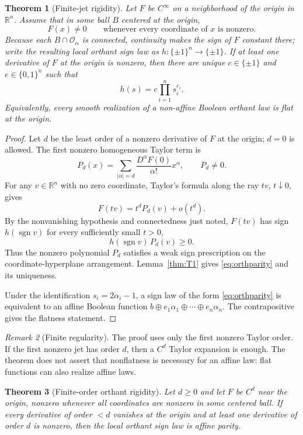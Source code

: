 \documentclass[11pt]{article}
\newtheorem{theorem}{Theorem}[section]
\theoremstyle{definition}
\theoremstyle{remark}
\newtheorem{remark}[theorem]{Remark}
\newcommand{\R}{\mathbb{R}}
\newcommand{\bits}{\{0,1\}}
\newcommand{\sign}{\operatorname{sgn}}
\begin{document}
\begin{theorem}[Finite-jet rigidity]\label{thm:T2}
Let $F$ be $C^\infty$ on a neighborhood of the origin in $\R^n$. Assume that in some ball $B$ centered at the origin,
\[
 F(x)\ne0
 \qquad\text{whenever every coordinate of $x$ is nonzero.}
\]
Because each $B\cap\mathcal O_\alpha$ is connected, continuity makes the sign of $F$ constant there; write the resulting local orthant sign law as $h:\{\pm1\}^n\to\{\pm1\}$. If at least one derivative of $F$ at the origin is nonzero, then there are unique $c\in\{\pm1\}$ and $e\in\bits^n$ such that
\begin{equation}\label{eq:orthparity}
 h(s)=c\prod_{i=1}^n s_i^{e_i}.
\end{equation}
Equivalently, every smooth realization of a non-affine Boolean orthant law is flat at the origin.
\end{theorem}

\begin{proof}
Let $d$ be the least order of a nonzero derivative of $F$ at the origin; $d=0$ is allowed. The first nonzero homogeneous Taylor term is
\[
 P_d(x)=\sum_{|\alpha|=d}\frac{D^\alpha F(0)}{\alpha!}x^\alpha,
 \qquad P_d\ne0.
\]
For any $v\in\R^n$ with no zero coordinate, Taylor's formula along the ray $tv$, $t\downarrow0$, gives
\[
 F(tv)=t^dP_d(v)+o(t^d).
\]
By the nonvanishing hypothesis and connectedness just noted, $F(tv)$ has sign $h(\sign v)$ for every sufficiently small $t>0$,
\[
 h(\sign v)\,P_d(v)\ge0.
\]
Thus the nonzero polynomial $P_d$ satisfies a weak sign prescription on the coordinate-hyperplane arrangement. Lemma~\ref{thm:T1} gives \eqref{eq:orthparity} and its uniqueness.

Under the identification $s_i=2\alpha_i-1$, a sign law of the form \eqref{eq:orthparity} is equivalent to an affine Boolean function $b\oplus e_1\alpha_1\oplus\cdots\oplus e_n\alpha_n$. The contrapositive gives the flatness statement.
\end{proof}

\begin{remark}[Finite regularity]
The proof uses only the first nonzero Taylor order. If the first nonzero jet has order $d$, then a $C^d$ Taylor expansion is enough. The theorem does not assert that nonflatness is necessary for an affine law: flat functions can also realize affine laws.
\end{remark}

\begin{theorem}[Finite-order orthant rigidity]\label{thm:finiteC}
Let $d\ge 0$ and let $F$ be $C^d$ near the origin, nonzero whenever all coordinates are nonzero in some centered ball. If every derivative of order $<d$ vanishes at the origin and at least one derivative of order $d$ is nonzero, then the local orthant sign law is affine parity.
\end{theorem}
\end{document}
